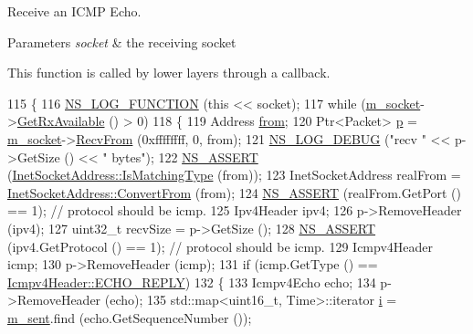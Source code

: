Receive an I\+C\+MP Echo. 


\begin{DoxyParams}{Parameters}
{\em socket} & the receiving socket\\
\hline
\end{DoxyParams}
This function is called by lower layers through a callback. 
\begin{DoxyCode}
115 \{
116   \hyperlink{log-macros-disabled_8h_a90b90d5bad1f39cb1b64923ea94c0761}{NS\_LOG\_FUNCTION} (\textcolor{keyword}{this} << socket);
117   \textcolor{keywordflow}{while} (\hyperlink{classns3_1_1V4Ping_a1f778736aaa1d07de9bb66375f20942f}{m\_socket}->\hyperlink{classns3_1_1Socket_ad35d8931e53ae0754ee864acb1cecd0e}{GetRxAvailable} () > 0)
118     \{
119       Address \hyperlink{lte__amc_8m_a1b4c81ff74eb1a626b5ade44c81004b3}{from};
120       Ptr<Packet> \hyperlink{lte__link__budget_8m_ac9de518908a968428863f829398a4e62}{p} = \hyperlink{classns3_1_1V4Ping_a1f778736aaa1d07de9bb66375f20942f}{m\_socket}->\hyperlink{classns3_1_1Socket_af22378d7af9a2745a9eada20210da215}{RecvFrom} (0xffffffff, 0, from);
121       \hyperlink{group__logging_ga413f1886406d49f59a6a0a89b77b4d0a}{NS\_LOG\_DEBUG} (\textcolor{stringliteral}{"recv "} << p->GetSize () << \textcolor{stringliteral}{" bytes"});
122       \hyperlink{assert_8h_a6dccdb0de9b252f60088ce281c49d052}{NS\_ASSERT} (\hyperlink{classns3_1_1InetSocketAddress_a9426766e34e928ce5dbdbeb9563a10df}{InetSocketAddress::IsMatchingType} (from));
123       InetSocketAddress realFrom = \hyperlink{classns3_1_1InetSocketAddress_ade776b1109e7b9a7be0b22ced49931e3}{InetSocketAddress::ConvertFrom} (from);
124       \hyperlink{assert_8h_a6dccdb0de9b252f60088ce281c49d052}{NS\_ASSERT} (realFrom.GetPort () == 1); \textcolor{comment}{// protocol should be icmp.}
125       Ipv4Header ipv4;
126       p->RemoveHeader (ipv4);
127       uint32\_t recvSize = p->GetSize ();
128       \hyperlink{assert_8h_a6dccdb0de9b252f60088ce281c49d052}{NS\_ASSERT} (ipv4.GetProtocol () == 1); \textcolor{comment}{// protocol should be icmp.}
129       Icmpv4Header icmp;
130       p->RemoveHeader (icmp);
131       \textcolor{keywordflow}{if} (icmp.GetType () == \hyperlink{classns3_1_1Icmpv4Header_a274c9ad4ec0e9a3249a370953e83e8aaace2d55cf7279c27e31f7001e23d05947}{Icmpv4Header::ECHO\_REPLY})
132         \{
133           Icmpv4Echo echo;
134           p->RemoveHeader (echo);
135           std::map<uint16\_t, Time>::iterator \hyperlink{bernuolliDistribution_8m_a6f6ccfcf58b31cb6412107d9d5281426}{i} = \hyperlink{classns3_1_1V4Ping_ad26f6eafcdbf6a787900a6c77099ef6e}{m\_sent}.find (echo.GetSequenceNumber ());

\end{DoxyCode}
